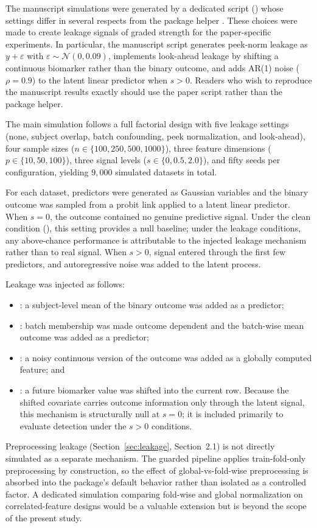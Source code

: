 \documentclass[article,shortnames]{jss}
\begin{document}
The manuscript simulations were generated by a dedicated script
() whose settings differ in several respects from
the package helper . These choices were
made to create leakage signals of graded strength for the paper-specific
experiments. In particular, the manuscript script generates peek-norm
leakage as $y + \varepsilon$ with $\varepsilon \sim \mathcal{N}(0, 0.09)$,
implements look-ahead leakage by shifting a continuous biomarker rather
than the binary outcome, and adds AR(1) noise ($\rho = 0.9$) to the latent
linear predictor when $s > 0$. Readers who wish to reproduce the manuscript
results exactly should use the paper script rather than the package helper.

The main simulation follows a full factorial design with five leakage
settings (none, subject overlap, batch confounding, peek normalization, and
look-ahead), four sample sizes ($n \in \{100, 250, 500, 1000\}$), three
feature dimensions ($p \in \{10, 50, 100\}$), three signal levels
($s \in \{0, 0.5, 2.0\}$), and fifty seeds per configuration, yielding
$9{,}000$ simulated datasets in total.

For each dataset, predictors were generated as Gaussian variables and the binary outcome was sampled from a probit link applied to a latent linear predictor. When $s = 0$, the outcome contained no genuine predictive signal. Under the clean condition (), this setting provides a null baseline; under the leakage conditions, any above-chance performance is attributable to the injected leakage mechanism rather than to real signal. When $s > 0$, signal entered through the first few predictors, and autoregressive noise was added to the latent process.

Leakage was injected as follows:
\begin{itemize}
    \item {}: a subject-level mean of the binary outcome was added as a predictor;
    \item {}: batch membership was made outcome dependent and the batch-wise mean outcome was added as a predictor;
    \item {}: a noisy continuous version of the outcome was added as a globally computed feature; and
    \item {}: a future biomarker value was shifted into the current row. Because the shifted covariate carries outcome information only through the latent signal, this mechanism is structurally null at $s = 0$; it is included primarily to evaluate detection under the $s > 0$ conditions.
\end{itemize}
Preprocessing leakage (Section~\ref{sec:leakage}, Section~2.1) is not directly
simulated as a separate mechanism. The guarded pipeline applies train-fold-only
preprocessing by construction, so the effect of global-vs-fold-wise
preprocessing is absorbed into the package's default behavior rather than
isolated as a controlled factor. A dedicated simulation comparing fold-wise and
global normalization on correlated-feature designs would be a valuable extension
but is beyond the scope of the present study.
\end{document}
